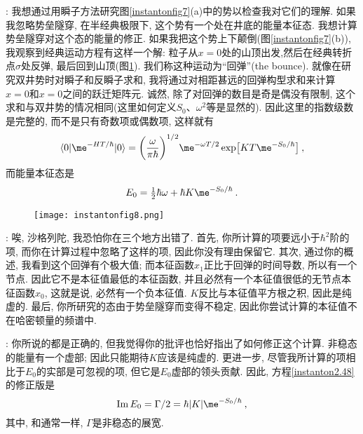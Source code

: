 : 我想通过用瞬子方法研究图\ref{instantonfig7}(a)中的势以检查我对它们的理解. 如果我忽略势垒隧穿, 在半经典极限下, 这个势有一个处在井底的能量本征态. 我想计算势垒隧穿对这个态的能量的修正. 如果我把这个势上下颠倒(图\ref{instantonfig7}(b)), 我观察到经典运动方程有这样一个解: 粒子从$x=0$处的山顶出发,然后在经典转折点$\sigma$处反弹, 最后回到山顶(图\ref{instantonfig8}). 我们称这种运动为``回弹''(the bounce). 就像在研究双井势时对瞬子和反瞬子求和, 我将通过对相距甚远的回弹构型求和来计算$x=0$和$x=0$之间的跃迁矩阵元. 诚然, 除了对回弹的数目是奇是偶没有限制, 这个求和与双井势的情况相同(这里如何定义$S_{0}$、$\omega^{2}$等是显然的). 因此这里的指数级数是完整的, 而不是只有奇数项或偶数项, 这样就有
\begin{equation}
    \langle 0 \vert \me^{-HT/\hbar} \vert 0 \rangle =\biggl(\frac{\omega}{\pi\hbar}\biggr)^{1/2} \me^{-\omega T/2}
    \exp\bigl[KT \me^{-S_{0}/\hbar}\bigr] \:, \label{instanton2.47}
\end{equation}
而能量本征态是
\begin{equation}
    E_{0}=\tfrac{1}{2}\hbar\omega+\hbar K\me^{-S_{0}/\hbar} \:. \label{instanton2.48}
\end{equation}

\begin{figure}[h]
    \centering
    \texttt{[image: instantonfig8.png]}
    \caption{ \label{instantonfig8}}
  \end{figure}

: 唉, 沙格列陀, 我恐怕你在三个地方出错了. 首先, 你所计算的项要远小于$\hbar^{2}$阶的项, 而你在计算过程中忽略了这样的项, 因此你没有理由保留它. 其次, 通过你的概述, 我看到这个回弹有个极大值; 而本征函数$x_{1}$正比于回弹的时间导数, 所以有一个节点. 因此它不是本征值最低的本征函数, 并且必然有一个本征值很低的无节点本征函数$x_{0}$, 这就是说, 必然有一个负本征值. $K$反比与本征值平方根之积, 因此是纯虚的. 最后, 你所研究的态由于势垒隧穿而变得不稳定, 因此你尝试计算的本征值不在哈密顿量的频谱中.

: 你所说的都是正确的, 但我觉得你的批评也恰好指出了如何修正这个计算. 非稳态的能量有一个虚部; 因此只能期待$K$应该是纯虚的. 更进一步, 尽管我所计算的项相比于$E_{0}$的实部是可忽视的项, 但它是$E_{0}$虚部的领头贡献. 因此, 方程\eqref{instanton2.48}的修正版是
\begin{equation}
    \operatorname{Im}E_{0}= \Gamma/2= \hbar \lvert K \rvert \me^{-S_{0}/\hbar} \:, \label{instanton2.49}
\end{equation}
其中, 和通常一样, $\Gamma$是非稳态的展宽.

